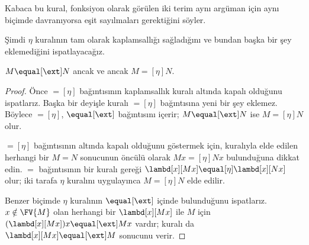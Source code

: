 Kabaca bu kural, fonksiyon olarak görülen iki terim aynı argüman için aynı
biçimde davranıyorsa eşit sayılmaları gerektiğini söyler.

Şimdi $\eta$ kuralının tam olarak kaplamsallığı sağladığını ve bundan başka
bir şey eklemediğini ispatlayacağız.

\begin{thm}
  $M \equal[\ext] N$ ancak ve ancak $M \equal[\eta] N$.
\end{thm}

\begin{proof}
  Önce $\equal[\eta]$ bağıntısının kaplamsallık kuralı altında kapalı olduğunu
  ispatlarız. Başka bir deyişle \ext{} kuralı $\equal[\eta]$ bağıntısına yeni
  bir şey eklemez. Böylece $\equal[\eta]$, $\equal[\ext]$ bağıntısını içerir;
  $M \equal[\ext] N$ ise $M \equal[\eta] N$ olur.

  $\equal[\eta]$ bağıntısının \ext{} altında kapalı olduğunu göstermek için,
  \ext{} kuralıyla elde edilen herhangi bir $M\equal N$ sonucunun öncülü
  olarak $Mx\equal[\eta]Nx$ bulunduğuna dikkat edin. $\equal$ bağıntısının
  bir kuralı gereği
  $\lambd[x][Mx]\equal[\eta]\lambd[x][Nx]$ olur; iki tarafa $\eta$ kuralını
  uygulayınca $M\equal[\eta]N$ elde edilir.

  Benzer biçimde $\eta$ kuralının $\equal[\ext]$ içinde bulunduğunu
  ispatlarız. $x\notin\FV{M}$ olan herhangi bir $\lambd[x][Mx]$ ile $M$ için
  $(\lambd[x][Mx])x\equal[\ext]Mx$ vardır; \ext{} kuralı da
  $\lambd[x][Mx]\equal[\ext]M$ sonucunu verir.
\end{proof}

